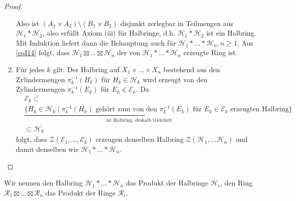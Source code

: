 \begin{proposition}
\begin{proof}
\begin{enumerate}[(\roman*),topsep=5pt]
	Also ist $(A_1 \times A_2) \setminus (B_1 \times B_2) $ disjunkt zerlegbar in Teilmengen aus $\mathcal{H}_1 \ast \mathcal{H}_2$, also erfüllt Axiom (iii) für Halbringe, d.h.  $\mathcal{H}_1 \ast \mathcal{H}_2$ ist ein Halbring. \\
	Mit Induktion liefert dann die Behauptung auch für $\mathcal{H}_1 \ast ... \ast \mathcal{H}_n, n\geq 1$. \newline
	Aus \eqref{eqI14} folgt, dass $\mathcal{H}_1 \boxtimes ... \boxtimes \mathcal{H}_n$ der von $\mathcal{H}_1 \ast ... \ast \mathcal{H}_n$ erzeugte Ring ist.
	\item Für jedes $k$ gilt: Der Halbring auf $X_1 \times ... \times X_n$ bestehend aus den Zylindermengen $\pi_k^{-1}(H_k)$ für $H_k \in \mathcal{H}_k$ wird erzeugt von den Zylindermengen $\pi_k^{-1}(E_k)$ für $E_k \in \mathcal{E}_k$. Da
	\begin{equation}
	\begin{split}
	& \mathcal{E}_k \subset \\ 
	& \underbrace{\{ H_k \in \mathcal{H}_k \mid \pi^{-1}_k (H_k) \text{ gehört zum von den } \pi^{-1}_k(E_k)   \text{ für } E_k \in \mathcal{E}_k \text{ erzeugten Halbring} \}}_{\text{ist Halbring, deshalb Gleicheit}}
	 \\ & \subset \mathcal{H}_k
	\end{split}
	\end{equation}
	folgt, dass $\mathcal{Z}(\mathcal{E}_1,...,\mathcal{E}_k)$ erzeugen denselben Halbring $\mathcal{Z}(\mathcal{H}_1,...\mathcal{H}_n)$ und damit denselben wie $\mathcal{H}_1 \ast ... \ast \mathcal{H}_n$.
\end{enumerate}
\end{proof}
\end{proposition}
\begin{definition}
Wir nennen den Halbring $\mathcal{H}_1 \ast ... \ast \mathcal{H}_n$ das Produkt der Halbringe $\mathcal{H}_i$, den Ring $\mathcal{R}_1 \boxtimes ... \boxtimes \mathcal{R}_n$ das Produkt der Ringe $\mathcal{R}_i$.
\end{definition}

